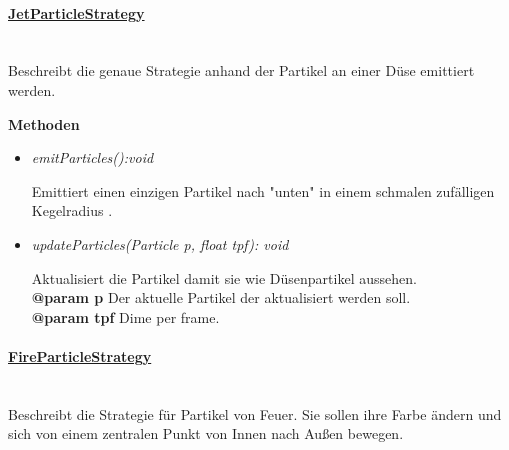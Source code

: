                 \pagebreak
                \paragraph{\underline{JetParticleStrategy}}\mbox{}\\
                    Beschreibt die genaue Strategie anhand der Partikel an einer Düse
                    emittiert werden.\par

                    \textbf{Methoden}
                    \begin{itemize}
                        \item \textit{emitParticles():void}
                            \begin{leftbar}[0.9\linewidth]
                            Emittiert einen einzigen Partikel nach "unten" in einem schmalen 
                            zufälligen Kegelradius .  
                            \end{leftbar}
                        \item \textit{updateParticles(Particle p, float tpf): void}
                            \begin{leftbar}[0.9\linewidth]
                            Aktualisiert die Partikel damit sie wie Düsenpartikel aussehen.\\  
                            \textbf{@param p} Der aktuelle Partikel der aktualisiert werden soll.\\
                            \textbf{@param tpf} Dime per frame.\\
                            \end{leftbar}
                    \end{itemize}
                
                \paragraph{\underline{FireParticleStrategy}}\mbox{}\\
                    Beschreibt die Strategie für Partikel von Feuer. Sie sollen ihre Farbe ändern
                    und sich von einem zentralen Punkt von Innen nach Außen bewegen.\par

